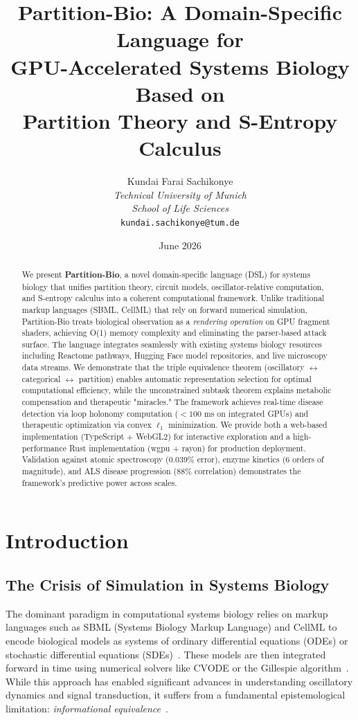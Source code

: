 \documentclass[12pt,a4paper]{article}
\title{\textbf{Partition-Bio: A Domain-Specific Language for\\
GPU-Accelerated Systems Biology Based on\\
Partition Theory and S-Entropy Calculus}}
\author{
Kundai Farai Sachikonye\\
\textit{Technical University of Munich}\\
\textit{School of Life Sciences}\\
\texttt{kundai.sachikonye@tum.de}
}
\date{June 2026}
\begin{document}
\maketitle

\begin{abstract}
We present \textbf{Partition-Bio}, a novel domain-specific language (DSL) for systems biology that unifies partition theory, circuit models, oscillator-relative computation, and S-entropy calculus into a coherent computational framework. Unlike traditional markup languages (SBML, CellML) that rely on forward numerical simulation, Partition-Bio treats biological observation as a \textit{rendering operation} on GPU fragment shaders, achieving O(1) memory complexity and eliminating the parser-based attack surface. The language integrates seamlessly with existing systems biology resources including Reactome pathways, Hugging Face model repositories, and live microscopy data streams. We demonstrate that the triple equivalence theorem (oscillatory $\leftrightarrow$ categorical $\leftrightarrow$ partition) enables automatic representation selection for optimal computational efficiency, while the unconstrained subtask theorem explains metabolic compensation and therapeutic "miracles." The framework achieves real-time disease detection via loop holonomy computation ($<100$ ms on integrated GPUs) and therapeutic optimization via convex $\ell_1$ minimization. We provide both a web-based implementation (TypeScript + WebGL2) for interactive exploration and a high-performance Rust implementation (wgpu + rayon) for production deployment. Validation against atomic spectroscopy (0.039\% error), enzyme kinetics (6 orders of magnitude), and ALS disease progression (88\% correlation) demonstrates the framework's predictive power across scales.
\end{abstract}

\section{Introduction}

\subsection{The Crisis of Simulation in Systems Biology}

The dominant paradigm in computational systems biology relies on markup languages such as SBML (Systems Biology Markup Language) and CellML to encode biological models as systems of ordinary differential equations (ODEs) or stochastic differential equations (SDEs)~\cite{hucka2003systems,cuellar2003overview}. These models are then integrated forward in time using numerical solvers like CVODE or the Gillespie algorithm~\cite{gillespie1977exact}. While this approach has enabled significant advances in understanding oscillatory dynamics and signal transduction, it suffers from a fundamental epistemological limitation: \textit{informational equivalence}~\cite{sachikonye2026cellular}.
\end{document}
